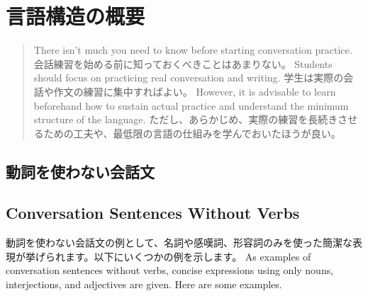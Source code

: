 \documentclass[uplatex,dvipdfmx,b5paper,english,10pt]{jsbook}
\newif\ifOUTLINEOFLANGUAGESTRUCTURE
\newif\ifVOICE
\newif\ifSHORTNOTES
\begin{document}
\ifVOICE

\fi%

\ifSHORTNOTES

\fi%

\tableofcontents

\mainmatter


\ifOUTLINEOFLANGUAGESTRUCTURE
\ifEnglish
\chapter{Outline of Language Structure}
\else
\chapter{言語構造の概要}
\fi

\begin{abstract}
\ifEnglish
There isn't much you need to know before starting conversation practice.
\else
会話練習を始める前に知っておくべきことはあまりない。
\fi
\ifEnglish
Students should focus on practicing real conversation and writing.
\else
学生は実際の会話や作文の練習に集中すればよい。
\fi
\ifEnglish
However, it is advisable to learn beforehand how to sustain actual practice and understand the minimum structure of the language.
\else
ただし、あらかじめ、実際の練習を長続きさせるための工夫や、最低限の言語の仕組みを学んでおいたほうが良い。
\fi
\end{abstract}


\ifJapanese
  \section{動詞を使わない会話文}
\else
  \section{Conversation Sentences Without Verbs}
\fi

\ifJapanese
動詞を使わない会話文の例として、名詞や感嘆詞、形容詞のみを使った簡潔な表現が挙げられます。以下にいくつかの例を示します。
\else
As examples of conversation sentences without verbs, concise expressions using only nouns, interjections, and adjectives are given. Here are some examples.
\fi
\end{document}

